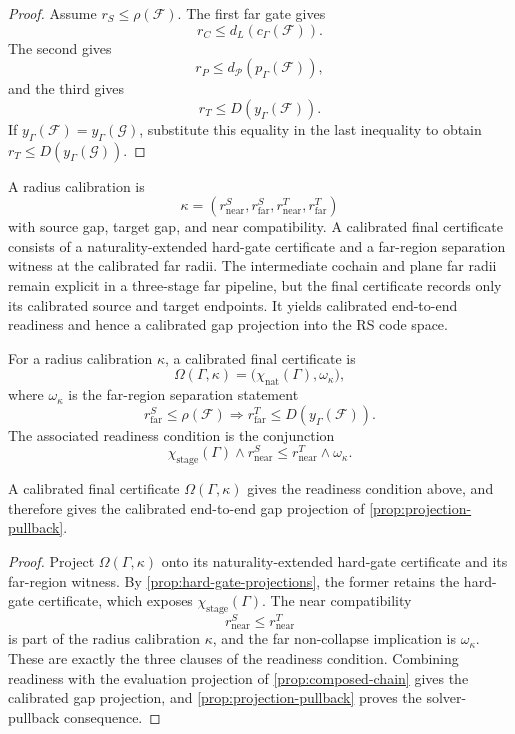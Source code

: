 \begin{proof}
Assume \(r_S\le\rho(\mathcal F)\). The first far gate gives
\[
  r_C\le d_L(c_\Gamma(\mathcal F)).
\]
The second gives
\[
  r_P\le d_{\mathcal P}(p_\Gamma(\mathcal F)),
\]
and the third gives
\[
  r_T\le D(y_\Gamma(\mathcal F)).
\]
If \(y_\Gamma(\mathcal F)=y_\Gamma(\mathcal G)\), substitute this equality in
the last inequality to obtain \(r_T\le D(y_\Gamma(\mathcal G))\).
\end{proof}

A radius calibration is
\[
  \kappa=(r^S_{\mathrm{near}},r^S_{\mathrm{far}},
          r^T_{\mathrm{near}},r^T_{\mathrm{far}})
\]
with source gap, target gap, and near compatibility. A calibrated final
certificate consists of a naturality-extended hard-gate certificate and a
far-region separation witness at the calibrated far radii. The intermediate
cochain and plane far radii remain explicit in a three-stage far pipeline, but
the final certificate records only its calibrated source and target endpoints.
It yields calibrated end-to-end readiness and hence a calibrated gap projection
into the RS code space.

\begin{definition}\label{def:calibrated-final-certificate}
For a radius calibration \(\kappa\), a calibrated final certificate is
\[
  \Omega(\Gamma,\kappa)
  =
  \bigl(\chi_{\mathrm{nat}}(\Gamma),\omega_\kappa\bigr),
\]
where \(\omega_\kappa\) is the far-region separation statement
\[
  r^S_{\mathrm{far}}\le \rho(\mathcal F)
  \Longrightarrow
  r^T_{\mathrm{far}}\le D(y_\Gamma(\mathcal F)).
\]
The associated readiness condition is the conjunction
\[
  \chi_{\mathrm{stage}}(\Gamma)
  \wedge
  r^S_{\mathrm{near}}\le r^T_{\mathrm{near}}
  \wedge
  \omega_\kappa.
\]
\end{definition}

\begin{proposition}\label{prop:final-cert-ready}
A calibrated final certificate \(\Omega(\Gamma,\kappa)\) gives the readiness
condition above, and therefore gives the calibrated end-to-end gap projection
of \cref{prop:projection-pullback}.
\end{proposition}

\begin{proof}
Project \(\Omega(\Gamma,\kappa)\) onto its naturality-extended hard-gate
certificate and its far-region witness. By
\cref{prop:hard-gate-projections}, the former retains the hard-gate certificate,
which exposes \(\chi_{\mathrm{stage}}(\Gamma)\). The near compatibility
\[
  r^S_{\mathrm{near}}\le r^T_{\mathrm{near}}
\]
is part of the radius calibration \(\kappa\), and the far non-collapse
implication is \(\omega_\kappa\). These are exactly the three clauses of the
readiness condition. Combining readiness with the evaluation
projection of \cref{prop:composed-chain} gives the calibrated gap projection,
and \cref{prop:projection-pullback} proves the solver-pullback consequence.
\end{proof}

